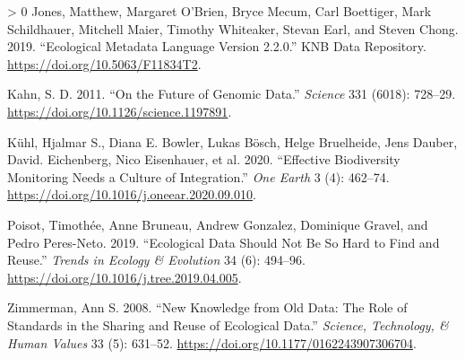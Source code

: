 \documentclass[10pt,oneside]{article}
\newlength{\cslhangindent}
\newenvironment{CSLReferences}[3] %
 {%
  \setlength{\parindent}{0pt}
  \ifodd #1 \everypar{\setlength{\hangindent}{\cslhangindent}}\ignorespaces\fi
  \ifnum #2 > 0
  \setlength{\parskip}{#2\baselineskip}
  \fi
 }%
 {}
\begin{document}
\begin{CSLReferences}{1}{0}
\leavevmode\hypertarget{ref-Jones2019EcoMet}{}%
Jones, Matthew, Margaret O'Brien, Bryce Mecum, Carl Boettiger, Mark
Schildhauer, Mitchell Maier, Timothy Whiteaker, Stevan Earl, and Steven
Chong. 2019. {``Ecological Metadata Language Version 2.2.0.''} KNB Data
Repository. \url{https://doi.org/10.5063/F11834T2}.

\leavevmode\hypertarget{ref-Kahn2011FutGen}{}%
Kahn, S. D. 2011. {``On the Future of Genomic Data.''} \emph{Science}
331 (6018): 728--29. \url{https://doi.org/10.1126/science.1197891}.

\leavevmode\hypertarget{ref-Kuhl2020EffBio}{}%
Kühl, Hjalmar S., Diana E. Bowler, Lukas Bösch, Helge Bruelheide, Jens
Dauber, David. Eichenberg, Nico Eisenhauer, et al. 2020. {``Effective
Biodiversity Monitoring Needs a Culture of Integration.''} \emph{One
Earth} 3 (4): 462--74.
\url{https://doi.org/10.1016/j.oneear.2020.09.010}.

\leavevmode\hypertarget{ref-Poisot2019EcoDat}{}%
Poisot, Timothée, Anne Bruneau, Andrew Gonzalez, Dominique Gravel, and
Pedro Peres-Neto. 2019. {``Ecological Data Should Not Be So Hard to Find
and Reuse.''} \emph{Trends in Ecology \& Evolution} 34 (6): 494--96.
\url{https://doi.org/10.1016/j.tree.2019.04.005}.

\leavevmode\hypertarget{ref-Zimmerman2008NewKno}{}%
Zimmerman, Ann S. 2008. {``New Knowledge from Old Data: The Role of
Standards in the Sharing and Reuse of Ecological Data.''} \emph{Science,
Technology, \& Human Values} 33 (5): 631--52.
\url{https://doi.org/10.1177/0162243907306704}.

\end{CSLReferences}
\end{document}
